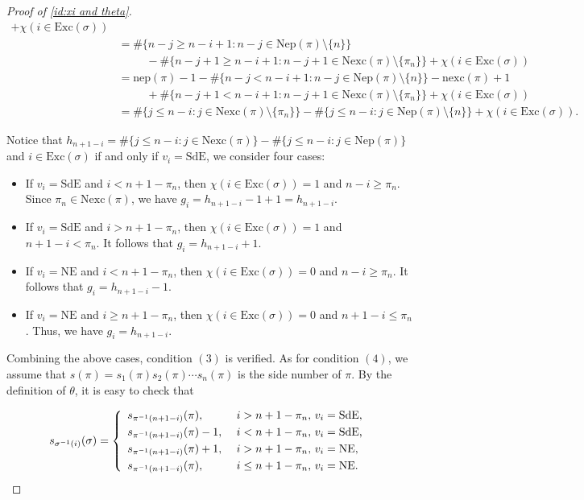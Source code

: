 \documentclass[12pt]{amsart}
\numberwithin{equation}{section}
\theoremstyle{plain}
\theoremstyle{definition}
\def\NE{\mathrm{NE}}
\def\SdE{\mathrm{SdE}}
\def\Exc{\mathrm{Exc}}
\def\Nexc{\mathrm{Nexc}}
\def\Nexcp{\mathrm{Nep}}
\def\nep{\mathrm{nep}}
\def\nexc{\mathrm{nexc}}
\begin{document}
\begin{proof}[Proof of \eqref{id:xi and theta}]
\begin{align*}
     +\chi(i \in \Exc(\sigma))\\[3pt]
     &=\#\{n-j \geq n-i+1: n-j \in \Nexcp(\pi)\setminus \{n\}\}\\[3pt]
   &\,\,\,\,\,\,\,\,\,\,\,\,\,\,\,-\#\{n-j+1 \geq n-i+1: n-j+1 \in \Nexc(\pi)\setminus \{\pi_n\}\}
    +\chi(i \in \Exc(\sigma))\\[3pt]
   &=   \nep(\pi) -1-\#\{n-j < n-i+1: n-j \in \Nexcp(\pi)\setminus \{n\}\}-\nexc(\pi)+1 \\[3pt]
   &\,\,\,\,\,\,\,\,\,\,\,\,\,\,\,+\#\{n-j+1 < n-i+1: n-j+1 \in \Nexc(\pi)\setminus \{\pi_n\}\} + \chi(i \in \Exc(\sigma))   \\[3pt]
   &=  \#\{j \le n-i: j \in \Nexc(\pi)\setminus \{\pi_n\}\} -\#\{j \le n-i: j \in \Nexcp(\pi)\setminus \{n\}\} + \chi(i \in \Exc(\sigma)).
\end{align*}

Notice that $h_{n+1-i}=\#\{j\le n-i: j \in \Nexc(\pi)\}-\#\{j\le n-i: j \in \Nexcp(\pi)\}$ and $i \in \Exc(\sigma)$ if and only if $v_i=\SdE$, we consider four cases:
\begin{itemize}
  \item [I.] If $v_i=\SdE$ and $i<n+1-\pi_n$, then $\chi(i \in \Exc(\sigma))=1$ and $n-i\ge \pi_n$. Since  $\pi_n \in \Nexc(\pi)$, we have $g_i=h_{n+1-i}-1+1=h_{n+1-i}$.
  \item [II.]If $v_i=\SdE$ and $i>n+1-\pi_n$, then $\chi(i \in \Exc(\sigma))=1$ and $n+1-i<\pi_n$. It follows that 
  $g_i=h_{n+1-i}+1$.
  \item [III.]If $v_i=\NE$ and $i<n+1-\pi_n$, then $\chi(i \in \Exc(\sigma))=0$ and $n-i\ge \pi_n$. It follows that
  $g_i=h_{n+1-i}-1$.
  \item [IV.]If $v_i=\NE$ and $i \geq n+1-\pi_n$, then $\chi(i \in \Exc(\sigma))=0$ and $n+1-i \leq \pi_n$. Thus, we have 
  $g_i=h_{n+1-i}$.
\end{itemize}
Combining the above cases, condition $(3)$ is verified.
As for condition $(4)$, we assume that $s(\pi)=s_1(\pi)s_2(\pi)\cdots s_n(\pi)$ is the side number of $\pi$. By the definition of $\theta$, it is easy to check that

\begin{equation}\label{eq:srelation}
s_{\sigma^{-1}(i)}(\sigma)= \left\{
  \begin{array}{ll}
s_{\pi^{-1}(n+1-i)}(\pi), & \mbox{ $ i>n+1-\pi_n,\, v_i=\SdE$,}\\[3pt]
s_{\pi^{-1}(n+1-i)}(\pi)-1, & \mbox{ $ i<n+1-\pi_n,\, v_i=\SdE$,}\\[3pt]
s_{\pi^{-1}(n+1-i)}(\pi)+1, & \mbox{ $ i>n+1-\pi_n,\, v_i=\NE$,}\\[3pt]
s_{\pi^{-1}(n+1-i)}(\pi),  & \mbox{ $ i\leq n+1-\pi_n,\, v_i=\NE$.}
 \end{array} \right.
\end{equation}


\end{proof}
\end{document}
